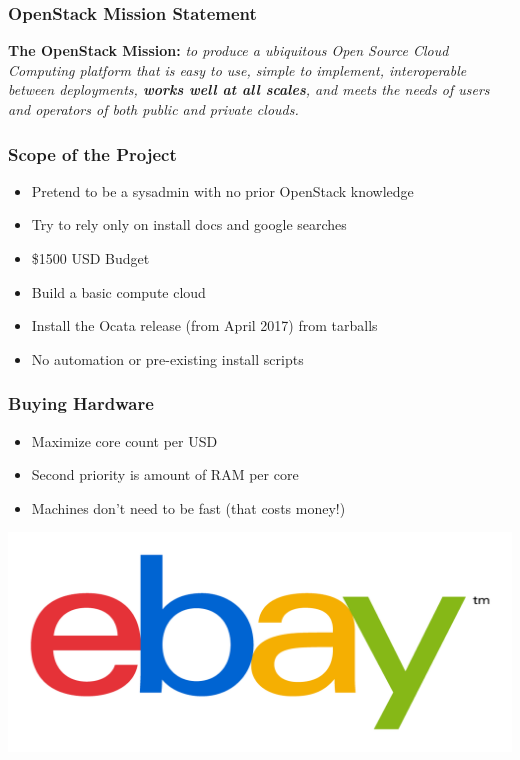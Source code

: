 \documentclass[aspectratio=169,11pt,hyperref={colorlinks=true}]{beamer}
\begin{document}
\begin{frame}
    \frametitle{OpenStack Mission Statement}
    \Large \textbf{The OpenStack Mission:} \textit{to produce a ubiquitous Open Source Cloud Computing platform that is easy to use, simple to implement, interoperable between deployments, \textbf{works well at all scales}, and meets the needs of users and operators of both public and private clouds.}
\end{frame}

\begin{frame}
\frametitle{Scope of the Project}
    \begin{itemize}
        \item Pretend to be a sysadmin with no prior OpenStack knowledge
        \item Try to rely only on install docs and google searches
        \item \$1500 USD Budget
        \item Build a basic compute cloud
        \item Install the Ocata release (from April 2017) from tarballs
        \item No automation or pre-existing install scripts
    \end{itemize}
\end{frame}

\begin{frame}
\frametitle{Buying Hardware}
    \begin{itemize}
        \item Maximize core count per USD
        \item Second priority is amount of RAM per core
        \item Machines don't need to be fast (that costs money!)
    \end{itemize}
\end{frame}

\begin{frame}
    \includegraphics[width=\textwidth]{EBay_logo.png}
\end{frame}
\end{document}
